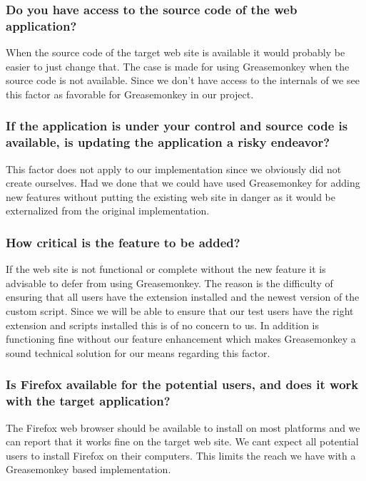\subsubsection{Do you have access to the source code of the web application?}

When the source code of the target web site is available it would probably
be easier to just change that. The case is made for using Greasemonkey when
the source code is not available. Since we don't have access to the internals
of \urort{} we see this factor as favorable for Greasemonkey in our project.

\subsubsection{If the application is under your control and source code is
  available, is updating the application a risky endeavor?}

This factor does not apply to our implementation since we obviously did not
create \urort{} ourselves. Had we done that we could have used
Greasemonkey for adding new features without putting the existing web
site in danger as it would be externalized from the original implementation.

\subsubsection{How critical is the feature to be added?}

If the web site is not functional or complete without the new feature
it is advisable to defer from using Greasemonkey. The reason is the
difficulty of ensuring that all users have the extension installed
and the newest version of the custom script. Since we will be able
to ensure that our test users have the right extension and scripts
installed this is of no concern to us. In addition \urort{} is
functioning fine without our feature enhancement which makes
Greasemonkey a sound technical solution for our means regarding this factor.


\subsubsection{Is Firefox available for the potential users, and does it
  work with the target application?}

The Firefox web browser should be available to install on most platforms
and we can report that it works fine on the target web site.
We cant expect all potential users to install Firefox on their
computers. This limits the reach we have with a Greasemonkey based
implementation.

